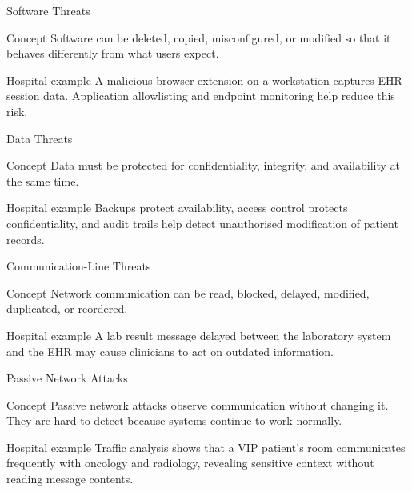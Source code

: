 \documentclass[presentation]{beamer}
\begin{document}
\begin{frame}[c]{Software Threats}
\begin{block}{Concept}
Software can be deleted, copied, misconfigured, or modified so that it behaves differently from
what users expect.
\end{block}

\begin{exampleblock}{Hospital example}
A malicious browser extension on a workstation captures EHR session data. Application allowlisting
and endpoint monitoring help reduce this risk.
\end{exampleblock}
\end{frame}

\begin{frame}[c]{Data Threats}
\begin{block}{Concept}
Data must be protected for confidentiality, integrity, and availability at the same time.
\end{block}

\begin{exampleblock}{Hospital example}
Backups protect availability, access control protects confidentiality, and audit trails help
detect unauthorised modification of patient records.
\end{exampleblock}
\end{frame}

\begin{frame}[c]{Communication-Line Threats}
\begin{block}{Concept}
Network communication can be read, blocked, delayed, modified, duplicated, or reordered.
\end{block}

\begin{exampleblock}{Hospital example}
A lab result message delayed between the laboratory system and the EHR may cause clinicians to
act on outdated information.
\end{exampleblock}
\end{frame}

\begin{frame}[c]{Passive Network Attacks}
\begin{block}{Concept}
Passive network attacks observe communication without changing it. They are hard to detect
because systems continue to work normally.
\end{block}

\begin{exampleblock}{Hospital example}
Traffic analysis shows that a VIP patient's room communicates frequently with oncology and
radiology, revealing sensitive context without reading message contents.
\end{exampleblock}
\end{frame}
\end{document}
